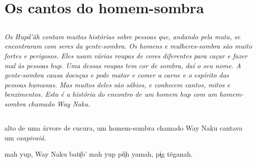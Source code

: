 \part{Os cantos do homem-sombra}

\chapter*{}
\thispagestyle{empty}

\vspace*{\fill}
\textit{Os Hupd'äh contam muitas histórias sobre pessoas que, andando pela mata, se
encontraram com seres da gente-sombra. Os homens e mulheres-sombra são muito fortes e perigosos. Eles usam várias roupas de cores diferentes para caçar e fazer mal às pessoas hup. Uma dessas roupas tem cor de sombra, daí o seu nome. A gente-sombra causa doenças e pode matar e comer a carne e o espírito das pessoas humanas. Mas muitos deles são sábios, e conhecem cantos, mitos e benzimentos. Esta é a história do encontro de um homem hup com um homem-sombra chamado Way Naku.}
\vspace*{\fill}

\openany

\chapter*{}
\mbox{}\vspace*{\fill}

\begingroup\raggedright\setlength{\linewidth}{.6\linewidth}


 alto de uma árvore de
cucura, um homem-sombra
chamado Way Naku cantava
um \textit{caapivaiá}.

\vspace{2em}

 mah yup, Way Naku
batɨ̗b’ mah yup pö̗h yamah,
pɨ̗g tëganah.

\vspace*{\fill}

\pagebreak

